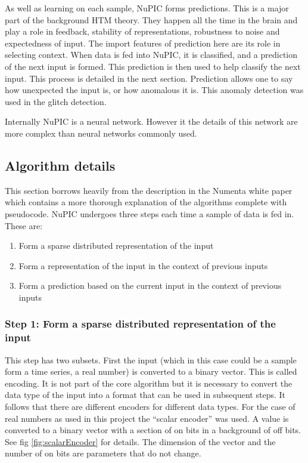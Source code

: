 \documentclass[a4paper]{jpconf}
\begin{document}
		As well as learning on each sample, NuPIC forms predictions. This is a major part of the background HTM theory. They happen all the time in the brain and play a role in feedback, stability of representations, robustness to noise and expectedness of input. The import features of prediction here are its role in selecting context. When data is fed into NuPIC, it is classified, and a prediction of the next input is formed. This prediction is then used to help classify the next input. This process is detailed in the next section. Prediction allows one to say how unexpected the input is, or how anomalous it is. This anomaly detection was used in the glitch detection.
		
		Internally NuPIC is a neural network. However it the details of this network are more complex than neural networks commonly used.
		
	\subsection{Algorithm details}
		This section borrows heavily from the description in the Numenta white paper which contains a more thorough explanation of the algorithms complete with pseudocode. NuPIC undergoes three steps each time a sample of data is fed in. These are:
		\begin{enumerate}
			\item Form a sparse distributed representation of the input
			\item Form a representation of the input in the context of previous inputs
			\item Form a prediction based on the current input in the context of previous inputs
		\end{enumerate}
		
		\subsubsection{Step 1: Form a sparse distributed representation of the input}
			This step has two subsets. First the input (which in this case could be a sample form a time series, a real number) is converted to a binary vector. This is called encoding. It is not part of the core algorithm but it is necessary to convert the data type of the input into a format that can be used in subsequent steps. It follows that there are different encoders for different data types. For the case of real numbers as used in this project the ``scalar encoder'' was used. A value is converted to a binary vector with a section of on bits in a background of off bits. See fig \ref{fig:scalarEncoder} for details. The dimension of the vector and the number of on bits are parameters that do not change.
			
\end{document}
